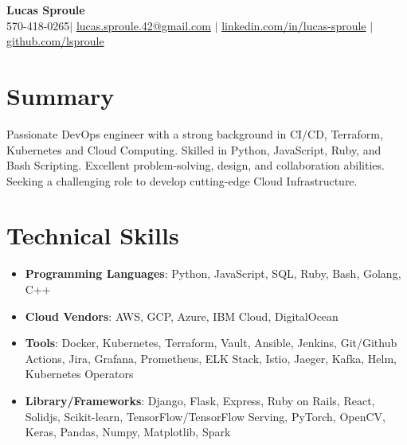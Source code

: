 \documentclass[letterpaper,10pt]{article}
\newcommand{\resumeItem}[1]{\item\small{#1}}
\newcommand{\resumeSubHeadingList}{\begin{itemize}[leftmargin=0.15in, label={}]}
\newcommand{\resumeSubHeadingListEnd}{\end{itemize}}
\begin{document}
\begin{center}
  \textbf{\Huge Lucas Sproule} \\
  \small 570-418-0265$|$ \href{mailto:lucas.sproule.42@gmail.com}{lucas.sproule.42@gmail.com} $|$ 
  \href{https://linkedin.com/in/lucas-sproule}{linkedin.com/in/lucas-sproule} $|$
  \href{https://github.com/lsproule}{github.com/lsproule}
\end{center}

\section*{Summary}
Passionate DevOps engineer with a strong background in CI/CD, Terraform, Kubernetes and Cloud Computing. Skilled in Python, JavaScript, Ruby, and Bash Scripting. Excellent problem-solving, design, and collaboration abilities. Seeking a challenging role to develop cutting-edge Cloud Infrastructure.

\section{Technical Skills}
\resumeSubHeadingList
  \resumeItem{\textbf{Programming Languages}: Python, JavaScript, SQL, Ruby, Bash, Golang, C++}
  \resumeItem{\textbf{Cloud Vendors}: AWS, GCP, Azure, IBM Cloud, DigitalOcean}
  \resumeItem{\textbf{Tools}: Docker, Kubernetes, Terraform, Vault,  Ansible, Jenkins, Git/Github Actions, Jira, Grafana, Prometheus, ELK Stack, Istio, Jaeger, Kafka, Helm, Kubernetes Operators}
  \resumeItem{\textbf{Library/Frameworks}: Django, Flask, Express, Ruby on Rails, React, Solidjs, Scikit-learn, TensorFlow/TensorFlow Serving, PyTorch, OpenCV, Keras, Pandas, Numpy, Matplotlib, Spark}
\resumeSubHeadingListEnd
\end{document}
